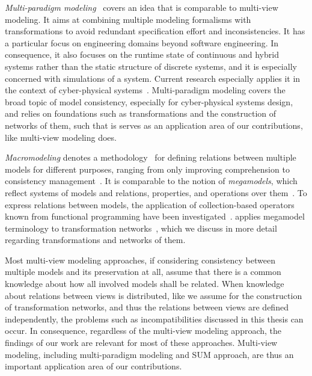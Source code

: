 \emph{Multi-paradigm modeling}~\cite{vangheluwe2003mpm-WSC} covers an idea that is comparable to multi-view modeling.
It aims at combining multiple modeling formalisms with transformations to avoid redundant specification effort and inconsistencies.
It has a particular focus on engineering domains beyond software engineering.
In consequence, it also focuses on the runtime state of continuous and hybrid systems rather than the static structure of discrete systems, and it is especially concerned with simulations of a system.
Current research especially applies it in the context of cyber-physical systems~\cite{carreira2020mpm4cpsfoundations}.
Multi-paradigm modeling covers the broad topic of model consistency, especially for cyber-physical systems design, and relies on foundations such as transformations and the construction of networks of them, such that is serves as an application area of our contributions, like multi-view modeling does.

\emph{Macromodeling} denotes a methodology~\cite{salay2012macromodelingMethodoloy-MODELS} for defining relations between multiple models for different purposes, ranging from only improving comprehension to consistency management~\cite{salay2008macromodeling-ASE,salay2009macromodels-CAiSE}.
It is comparable to the notion of \emph{megamodels}, which reflect systems of models and relations, properties, and operations over them~\cite{diskin2013megamodeling-SLE}.
To express relations between models, the application of collection-based operators known from functional programming have been investigated~\cite{salay2015megamodeling-MODELS, salay2020megamodeling-SoSym}.
 applies megamodel terminology to transformation networks~\cite{stevens2020BuildingFromMegamodels-SoSym}, which we discuss in more detail regarding transformations and networks of them.

Most multi-view modeling approaches, if considering consistency between multiple models and its preservation at all, assume that there is a common knowledge about how all involved models shall be related.
When knowledge about relations between views is distributed, like we assume for the construction of transformation networks, and thus the relations between views are defined independently, the problems such as incompatibilities discussed in this thesis can occur. 
In consequence, regardless of the multi-view modeling approach, the findings of our work are relevant for most of these approaches.
Multi-view modeling, including multi-paradigm modeling and \gls{SUM} approach, are thus an important application area of our contributions.


